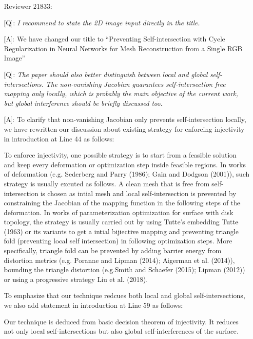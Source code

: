 \documentclass[10pt]{letter} %
\newcommand{\mdf}[1]{\textcolor[rgb]{1.00,0.00,1.00}{#1}}
\begin{document}
	\hdashrule{\linewidth}{1pt}{1mm}
	Reviewer 21833:
	
	[Q]: \emph{I recommend to state the 2D image input directly in the title.}
	
	[A]: We have changed our title to ``Preventing Self-intersection with Cycle Regularization \mdf{in Neural Networks for Mesh Reconstruction from a Single RGB Image}''
	
	[Q]: \emph{The paper should also better distinguish between local and global self-intersections. The non-vanishing Jacobian guarantees self-intersection free mapping only locally, which is probably the main objective of the current work, but global interference should be briefly discussed too.}
	
	[A]: To clarify that non-vanishing Jacobian only prevents self-intersection locally, we have rewritten our discussion about existing strategy for enforcing injectivity in introduction at Line 44 as follows:
	
	\mdf{To enforce injectivity, one possible strategy is to start from a feasible solution and keep every deformation or optimization step inside feasible regions. In works of deformation (e.g. Sederberg and Parry (1986); Gain and Dodgson (2001)), such strategy is usually excuted as follows. A clean mesh that is free from self-intersection is chosen as intial mesh and local self-intersection is prevented by constraining the Jacobian of the mapping function in the following steps of the deformation. In works of parameterization optimization for surface with disk topology, the strategy is usually carried out by using Tutte’s embedding Tutte (1963) or its variants to get a intial bijiective mapping and preventing triangle fold (preventing local self intersection) in following optimization steps. More specifically, triangle fold can be prevented by adding barrier energy from distortion metrics (e.g. Poranne and Lipman (2014); Aigerman et al. (2014)), bounding the triangle distortion (e.g.Smith and Schaefer (2015); Lipman (2012)) or using a progressive strategy Liu et al. (2018). }
	
	To emphasize that our technique redcues both local and global self-intersections, we also add statement in introduction at Line 59 as follows:
	
	\mdf{Our technique is deduced from basic decision theorem of injectivity. It reduces not only local self-intersections but also global self-interferences of the surface.}
	
\end{document}

